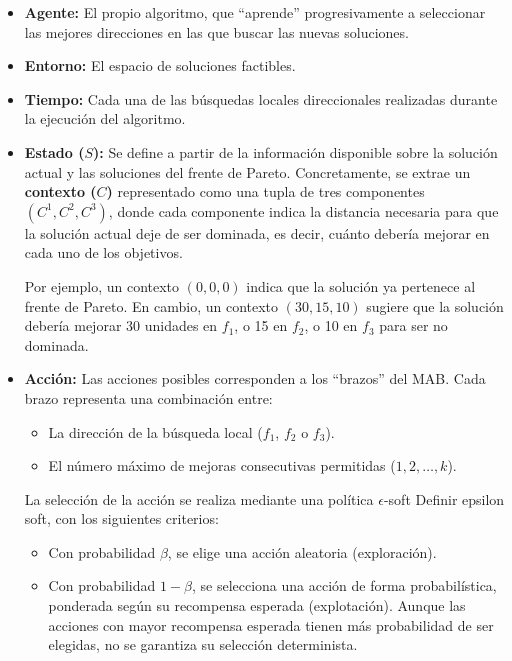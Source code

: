 \documentclass[12pt,a4paper]{book}
\begin{document}
\begin{itemize}
    \item \textbf{Agente:} El propio algoritmo, que ``aprende'' progresivamente a seleccionar las mejores direcciones en las que buscar las nuevas soluciones.
    
    \item \textbf{Entorno:} El espacio de soluciones factibles.
    
    \item \textbf{Tiempo:} Cada una de las búsquedas locales direccionales realizadas durante la ejecución del algoritmo.
    
    \item \textbf{Estado ($S$):} Se define a partir de la información disponible sobre la solución actual y las soluciones del frente de Pareto. Concretamente, se extrae un \textbf{contexto ($C$)} representado como una tupla de tres componentes $(C^1, C^2, C^3)$, donde cada componente indica la distancia necesaria para que la solución actual deje de ser dominada, es decir, cuánto debería mejorar en cada uno de los objetivos.
    
    Por ejemplo, un contexto $(0, 0, 0)$ indica que la solución ya pertenece al frente de Pareto. En cambio, un contexto $(30, 15, 10)$ sugiere que la solución debería mejorar 30 unidades en $f_1$, o 15 en $f_2$, o 10 en $f_3$ para ser no dominada.

    \item \textbf{Acción:} Las acciones posibles corresponden a los ``brazos'' del MAB. Cada brazo representa una combinación entre:
    \begin{itemize}
        \item La dirección de la búsqueda local ($f_1$, $f_2$ o $f_3$).
        \item El número máximo de mejoras consecutivas permitidas ($1, 2, \dots, k$).
    \end{itemize}

    La selección de la acción se realiza mediante una política $\epsilon$-soft \color{red} Definir epsilon soft\color{black}, con los siguientes criterios:
    \begin{itemize}
        \item Con probabilidad $\beta$, se elige una acción aleatoria (exploración).
        \item Con probabilidad $1 - \beta$, se selecciona una acción de forma probabilística, ponderada según su recompensa esperada (explotación). Aunque las acciones con mayor recompensa esperada tienen más probabilidad de ser elegidas, no se garantiza su selección determinista.
    \end{itemize}


\end{itemize}
\end{document}
